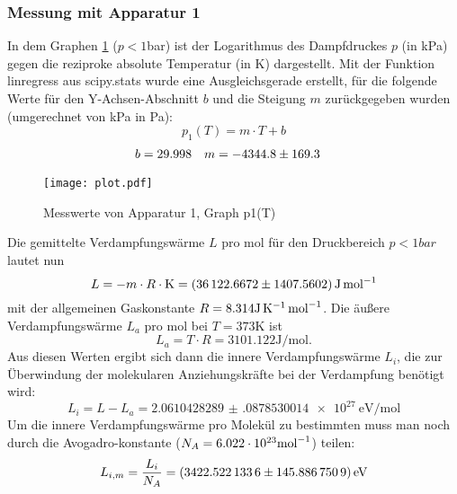   \subsubsection{Messung mit Apparatur 1}
  In dem Graphen \ref{fig:p1(T)} ($p < 1$\si{bar})
  ist der Logarithmus des Dampfdruckes $p$ (in \si{\kPa})
  gegen die reziproke absolute Temperatur (in \si{\kelvin}) dargestellt.
  Mit der Funktion linregress aus scipy.stats
  wurde eine Ausgleichsgerade erstellt, für die folgende Werte für den
  Y-Achsen-Abschnitt $b$ und die Steigung $m$ zurückgegeben wurden (umgerechnet
  von \si{\kPa} in \si{\Pa}):
  \begin{equation}
    p_1(T) = m \cdot T + b
  \end{equation}
  \begin{align}
    b & = 29.998 &  m & = \num{-4344.8 +- 169.3}
  \end{align}
  \begin{figure}
    \centering
    \texttt{[image: plot.pdf]}
    \caption{Messwerte von Apparatur 1, Graph p1(T)}
    \label{fig:p1(T)}
  \end{figure}

  Die gemittelte Verdampfungswärme $L$ pro \si{mol} für den Druckbereich
  $p < 1\si{bar}$ lautet nun
  \begin{equation}
    L = -m \cdot R \cdot \si{\kelvin} =
    \SI{36122.6672 +- 1407.5602}{\joule\per\mol}
  \end{equation}
  mit der allgemeinen Gaskonstante\cite{gaskonstante}
  $R = 8.314\si[per-mode=reciprocal]{\joule\per\kelvin\per\mol}$.
  Die äußere Verdampfungswärme $L_a$ pro \si{mol} bei $T = 373\si{\kelvin}$ ist
  \begin{equation}
    L_a = T \cdot R = 3101.122 \si{\joule\per\mol}.
  \end{equation}
  Aus diesen Werten ergibt sich dann die innere Verdampfungswärme $L_i$, die
  zur Überwindung der molekularen Anziehungskräfte bei der Verdampfung benötigt
  wird:
  \begin{equation}
    L_i = L - L_a = \SI{2.0610428289(0878530014)e27}{\electronvolt\per\mol}
  \end{equation}
  Um die innere Verdampfungswärme pro Molekül zu bestimmten muss man noch durch
  die Avogadro-konstante\cite{avogadro}
  ($N_A = 6.022 \cdot 10^{23} \si[per-mode=reciprocal]{\per\mol}$) teilen:
  \begin{equation}
    L_{i,m} = \frac{L_i}{N_A} = \SI{3422.5221336 +- 145.8867509}{\electronvolt}
  \end{equation}
  \newpage
